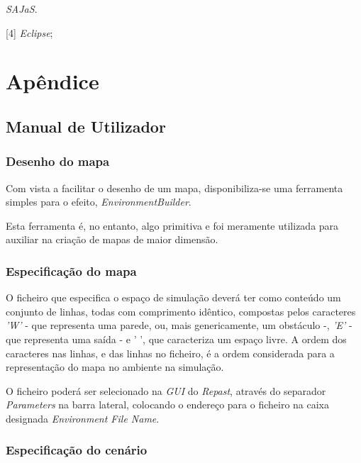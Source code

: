 \documentclass[12pt]{article}
\begin{document}
\begin{titlepage}
[3] \textit{SAJaS}.

[4] \textit{Eclipse};

\newpage

\section{Apêndice}


\subsection{Manual de Utilizador}

\subsubsection{Desenho do mapa}

Com vista a facilitar o desenho de um mapa, disponibiliza-se uma ferramenta simples para o efeito, \textit{EnvironmentBuilder}.

Esta ferramenta é, no entanto, algo primitiva e foi meramente utilizada para auxiliar na criação de mapas de maior dimensão.

\subsubsection{Especificação do mapa}

O ficheiro que especifica o espaço de simulação deverá ter como conteúdo um conjunto de linhas, todas com comprimento idêntico, compostas pelos caracteres \textit{'W'} - que representa uma parede, ou, mais genericamente, um obstáculo -, \textit{'E'} - que representa uma saída - e {' '}, que caracteriza um espaço livre. A ordem dos caracteres nas linhas, e das linhas no ficheiro, é a ordem considerada para a representação do mapa no ambiente na simulação.

O ficheiro poderá ser selecionado na \textit{GUI} do \textit{Repast}, através do separador \textit{Parameters} na barra lateral, colocando o endereço para o ficheiro na caixa designada \textit{Environment File Name}.

\subsubsection{Especificação do cenário}


\end{titlepage}
\end{document}
